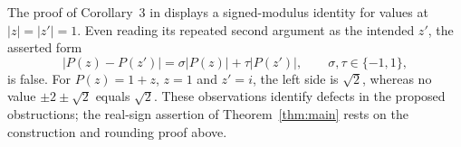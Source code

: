 The proof of Corollary~3 in
\cite{ElAbdalaoui2025Generalization} displays a signed-modulus identity
for values at $|z|=|z'|=1$.
Even reading its repeated second argument as the intended $z'$, the
asserted form
\[
 |P(z)-P(z')|=\sigma|P(z)|+\tau|P(z')|,
 \qquad \sigma,\tau\in\{-1,1\},
\]
is false. For $P(z)=1+z$, $z=1$ and $z'=i$, the left side is $\sqrt2$,
whereas no value $\pm2\pm\sqrt2$ equals $\sqrt2$.
These observations identify defects in the proposed obstructions;
the real-sign assertion of Theorem~\ref{thm:main} rests on the
construction and rounding proof above.
